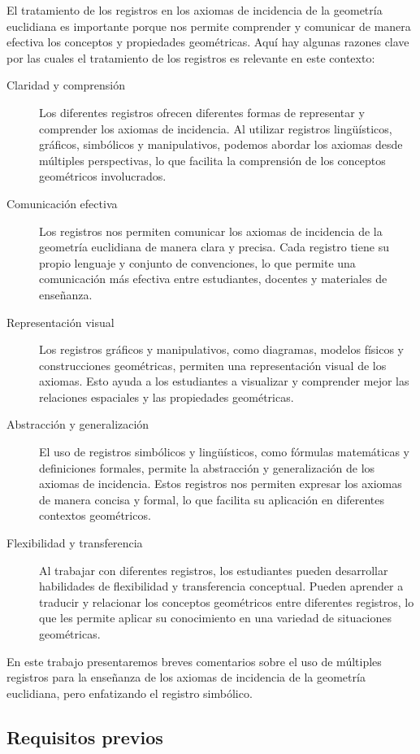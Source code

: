 El tratamiento de los registros en los axiomas de incidencia de la geometría euclidiana es importante porque nos permite comprender y comunicar de manera efectiva los conceptos y propiedades geométricas. Aquí hay algunas razones clave por las cuales el tratamiento de los registros es relevante en este contexto:
\begin{description}
	\item[Claridad y comprensión] Los diferentes registros ofrecen diferentes formas de representar y comprender los axiomas de incidencia. Al utilizar registros lingüísticos, gráficos, simbólicos y manipulativos, podemos abordar los axiomas desde múltiples perspectivas, lo que facilita la comprensión de los conceptos geométricos involucrados.
	\item[Comunicación efectiva] Los registros nos permiten comunicar los axiomas de incidencia de la geometría euclidiana de manera clara y precisa. Cada registro tiene su propio lenguaje y conjunto de convenciones, lo que permite una comunicación más efectiva entre estudiantes, docentes y materiales de enseñanza.
	\item[Representación visual] Los registros gráficos y manipulativos, como diagramas, modelos físicos y construcciones geométricas, permiten una representación visual de los axiomas. Esto ayuda a los estudiantes a visualizar y comprender mejor las relaciones espaciales y las propiedades geométricas.
	\item[Abstracción y generalización] El uso de registros simbólicos y lingüísticos, como fórmulas matemáticas y definiciones formales, permite la abstracción y generalización de los axiomas de incidencia. Estos registros nos permiten expresar los axiomas de manera concisa y formal, lo que facilita su aplicación en diferentes contextos geométricos.
	\item[Flexibilidad y transferencia] Al trabajar con diferentes registros, los estudiantes pueden desarrollar habilidades de flexibilidad y transferencia conceptual. Pueden aprender a traducir y relacionar los conceptos geométricos entre diferentes registros, lo que les permite aplicar su conocimiento en una variedad de situaciones geométricas.
\end{description}

En este trabajo presentaremos breves comentarios sobre el uso de múltiples registros para la enseñanza de los axiomas de incidencia de la geometría euclidiana, pero enfatizando el registro simbólico. 

\subsection{Requisitos previos}

